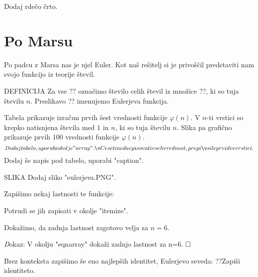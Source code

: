 \documentclass[a4paper,12pt]{article}
\def\qed{$\hfill\Box$}   %
\begin{document}
\noindent
Dodaj rdečo črto.

\section{Po Marsu}
Po padcu z Marsa nas je ujel Euler. Kot naš rešitelj si je privoščil predstaviti nam svojo funkcijo iz teorije števil.

DEFINICIJA
Za vse ?? označimo število celih števil iz množice
??, ki so tuja številu $n$. Preslikavo ?? imenujemo Eulerjeva
funkcija.




\begin{table}[h!]
Tabela prikazuje izračun prvih šest vrednosti funkcije $\varphi (n)$. V $n$-ti
vrstici so krepko natisnjena števila med $1$ in $n$, ki so tuja številu $n$. Slika pa grafično prikazuje prvih $100$ vrednosti funkcije $\varphi (n)$.
\[
Dodaj tabelo, uporabi okolje "array". Če se ti ne da vpisovati vseh vrednost, prepiši le prvi dve vrstici.
\] 
Dodaj še napis pod tabelo, uporabi "caption".
\end{table}

SLIKA
Dodaj sliko "eulerjeva.PNG".

Zapišimo nekaj lastnosti te funkcije:

Potrudi se jih zapisati v okolje "itemize".

Dokažimo, da zadnja lastnost zagotovo velja za $n=6$.

{\emph Dokaz:}
V okolju "eqnarray" dokaži zadnjo lastnost za n=6.
\qed

Brez konteksta zapišimo še eno najlepših identitet, Eulerjevo seveda:
??Zapiši identiteto.
\end{document}
